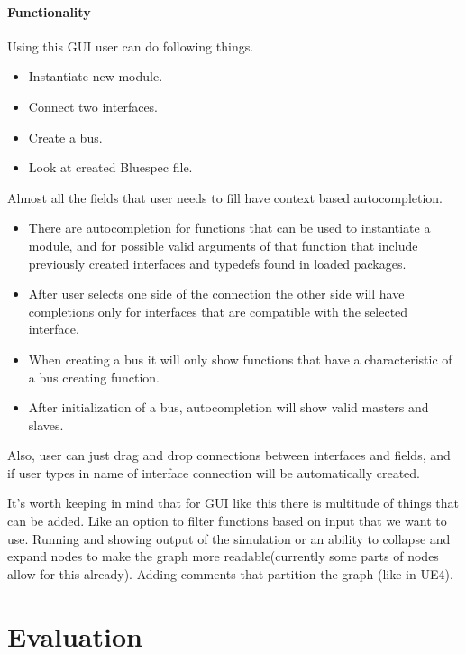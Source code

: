 \documentclass[14pt]{report}
\begin{document}
\subsubsection{Functionality}
Using this GUI user can do following things. 
\begin{itemize}
    \item Instantiate new module. 
    \item Connect two interfaces.
    \item Create a bus.
    \item Look at created Bluespec file.
\end{itemize}
Almost all the fields that user needs to fill have context based autocompletion. 
\begin{itemize}
    \item There are autocompletion for functions that can be used to instantiate a module, and for possible valid arguments of that function that include previously created interfaces and typedefs found in loaded packages.
    \item After user selects one side of the connection the other side will have completions only for interfaces that are compatible with the selected interface. 
    \item When creating a bus it will only show functions that have a characteristic of a bus creating function.
    \item After initialization of a bus, autocompletion will show valid masters and slaves. 
\end{itemize}
Also, user can just drag and drop connections between interfaces and fields, and if user types in name of interface connection will be automatically created.

\begin{tcolorbox}[title=Futher work]
    It's worth keeping in mind that for GUI like this there is multitude of things that can be added. Like an option to filter functions based on input that we want to use. Running and showing output of the simulation or an ability to collapse and expand nodes to make the graph more readable(currently some parts of nodes allow for this already). Adding comments that partition the graph (like in UE4).
\end{tcolorbox}

\chapter{Evaluation}
\end{document}
